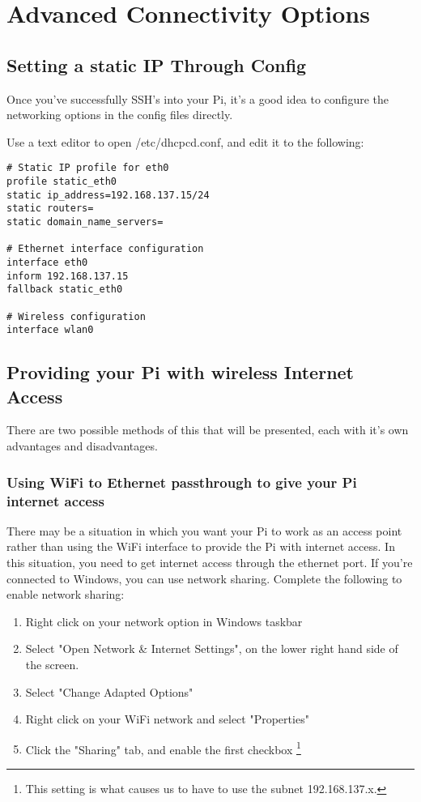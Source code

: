 \section{Advanced Connectivity Options}
\subsection{Setting a static IP Through Config}
Once you've successfully SSH's into your Pi, it's a good idea to configure the networking options in the config files directly.

Use a text editor to open /etc/dhcpcd.conf, and edit it to the following:
\begin{verbatim}
# Static IP profile for eth0
profile static_eth0
static ip_address=192.168.137.15/24
static routers=
static domain_name_servers=

# Ethernet interface configuration 
interface eth0
inform 192.168.137.15
fallback static_eth0

# Wireless configuration
interface wlan0
\end{verbatim}

\subsection{Providing your Pi with wireless Internet Access}
There are two possible methods of this that will be presented, each with it's own advantages and disadvantages.
\subsubsection{Using WiFi to Ethernet passthrough to give your Pi internet access}
There may be a situation in which you want your Pi to work as an access point rather than using the WiFi interface to provide the Pi with internet access. In this situation, you need to get internet access through the ethernet port. If you're connected to Windows, you can use network sharing. Complete the following to enable network sharing:

\begin{enumerate}
    \item Right click on your network option in Windows taskbar
    \item Select  "Open Network \& Internet Settings", on the lower right hand side of the screen.
    \item Select "Change Adapted Options"
    \item Right click on your WiFi network and select "Properties"
    \item Click the "Sharing" tab, and enable the first checkbox \footnote{This setting is what causes us to have to use the subnet 192.168.137.x.}
\end{enumerate}


